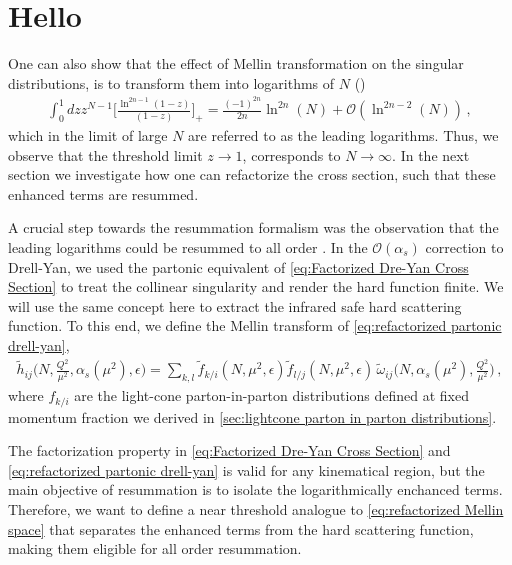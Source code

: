 \section{Hello}

One can also show that the effect of Mellin transformation on the singular distributions, is to transform them into logarithms of $N$ ()
\begin{align}
    \int_{0}^{1}dz z^{N-1}\Big[\frac{\ln^{2n-1}(1-z)}{(1-z)}\Big]_{+}=\frac{(-1)^{2n}}{2n}\ln^{2n}(N)+\mathcal{O}(\ln^{2n-2}(N))\,,
\end{align}
which in the limit of large $N$ are referred to as the leading logarithms. Thus, we observe that the threshold limit $z\rightarrow 1$, corresponds to $N\rightarrow\infty$. In the next section we investigate how one can refactorize the cross section, such that these enhanced terms are resummed. 


A crucial step towards the resummation formalism was the observation that the leading logarithms could be resummed to all order \cite{Parisi:1979xd}. In the $\mathcal{O}(\alpha_s)$ correction to Drell-Yan, we used the partonic equivalent of \cref{eq:Factorized Dre-Yan Cross Section} to treat the collinear singularity and render the hard function finite. We will use the same concept here to extract the infrared safe hard scattering function. To this end, we define the Mellin transform of \cref{eq:refactorized partonic drell-yan},
\begin{align}\label{eq:refactorized Mellin space}
    \tilde{h}_{ij}\Big(N,\frac{Q^{2}}{\mu^2},\alpha_s(\mu^{2}),\epsilon\Big)=\sum_{k,l}\tilde{f}_{k/i}(N,\mu^{2},\epsilon)\tilde{f}_{l/j}(N,\mu^{2},\epsilon)\,\tilde{\omega}_{ij}\Big(N,\alpha_{s}(\mu^{2}),\frac{Q^{2}}{\mu^{2}}\Big)\,,
\end{align}
where $f_{k/i}$ are the light-cone parton-in-parton distributions defined at fixed momentum fraction we derived in \cref{sec:lightcone parton in parton distributions}. 

The factorization property in \cref{eq:Factorized Dre-Yan Cross Section} and \cref{eq:refactorized partonic drell-yan} is valid for any kinematical region, but the main objective of resummation is to isolate the logarithmically enchanced terms. Therefore, we want to define a near threshold analogue to \cref{eq:refactorized Mellin space} that separates the enhanced terms from the hard scattering function, making them eligible for all order resummation. 

